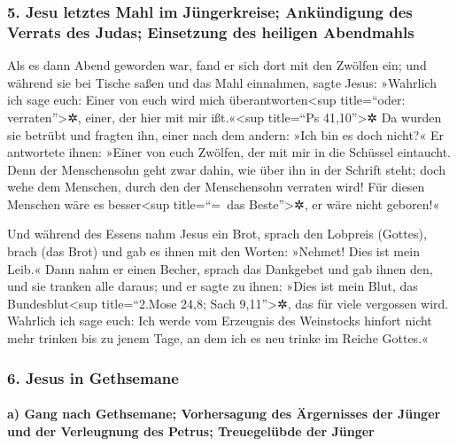 \hypertarget{jesu-letztes-mahl-im-juxfcngerkreise-ankuxfcndigung-des-verrats-des-judas-einsetzung-des-heiligen-abendmahls}{%
\subsubsection{5. Jesu letztes Mahl im Jüngerkreise; Ankündigung des
Verrats des Judas; Einsetzung des heiligen
Abendmahls}\label{jesu-letztes-mahl-im-juxfcngerkreise-ankuxfcndigung-des-verrats-des-judas-einsetzung-des-heiligen-abendmahls}}

 Als es dann Abend geworden war, fand er sich dort mit
den Zwölfen ein;  und während sie bei Tische saßen und
das Mahl einnahmen, sagte Jesus: »Wahrlich ich sage euch: Einer von euch
wird mich überantworten\textless sup title=``oder:
verraten''\textgreater✲, einer, der hier mit mir ißt.«\textless sup
title=``Ps 41,10''\textgreater✲  Da wurden sie betrübt
und fragten ihn, einer nach dem andern: »Ich bin es doch nicht?«
 Er antwortete ihnen: »Einer von euch Zwölfen, der mit
mir in die Schüssel eintaucht.  Denn der Menschensohn
geht zwar dahin, wie über ihn in der Schrift steht; doch wehe dem
Menschen, durch den der Menschensohn verraten wird! Für diesen Menschen
wäre es besser\textless sup title=``=~das Beste''\textgreater✲, er wäre
nicht geboren!«

 Und während des Essens nahm Jesus ein Brot, sprach den
Lobpreis (Gottes), brach (das Brot) und gab es ihnen mit den Worten:
»Nehmet! Dies ist mein Leib.«  Dann nahm er einen Becher,
sprach das Dankgebet und gab ihnen den, und sie tranken alle daraus;
 und er sagte zu ihnen: »Dies ist mein Blut, das
Bundesblut\textless sup title=``2.Mose 24,8; Sach 9,11''\textgreater✲,
das für viele vergossen wird.  Wahrlich ich sage euch:
Ich werde vom Erzeugnis des Weinstocks hinfort nicht mehr trinken bis zu
jenem Tage, an dem ich es neu trinke im Reiche Gottes.«

\hypertarget{jesus-in-gethsemane}{%
\subsubsection{6. Jesus in Gethsemane}\label{jesus-in-gethsemane}}

\hypertarget{a-gang-nach-gethsemane-vorhersagung-des-uxe4rgernisses-der-juxfcnger-und-der-verleugnung-des-petrus-treuegeluxfcbde-der-juxfcnger}{%
\paragraph{a) Gang nach Gethsemane; Vorhersagung des Ärgernisses der
Jünger und der Verleugnung des Petrus; Treuegelübde der
Jünger}\label{a-gang-nach-gethsemane-vorhersagung-des-uxe4rgernisses-der-juxfcnger-und-der-verleugnung-des-petrus-treuegeluxfcbde-der-juxfcnger}}

